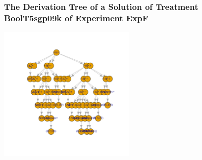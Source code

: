  \begin{frame}
 \frametitle{ The Derivation Tree of a Solution of Treatment BoolT5sgp09k of Experiment ExpF }
 \begin{center}
\includegraphics[width=0.5\textwidth, angle=0]
{ExpFDerivationTreeFigure007.pdf}
 \end{center}
 \label{report/ExpFDerivationTreeFigure007.pdf}  
 \end{frame}

